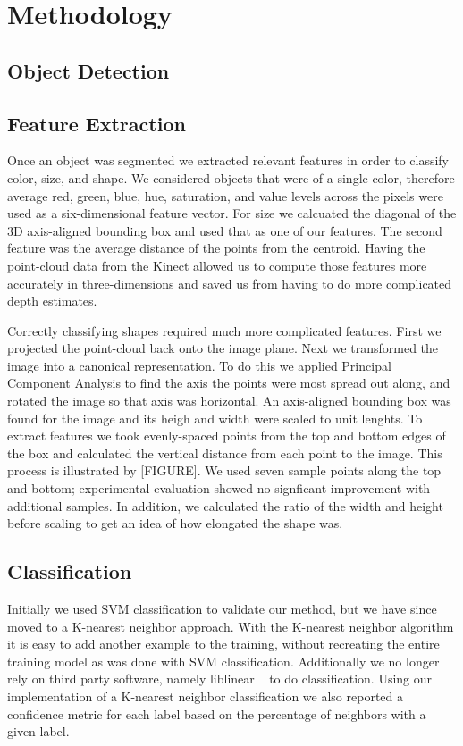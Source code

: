 \documentclass[11pt]{article}
\newcommand{\xxx}[1]{{\bf \color{red} #1}}
\begin{document}
\section{Methodology}

\subsection{Object Detection}

\subsection{Feature Extraction}

Once an object was segmented we extracted relevant features in order to classify
color, size, and shape. We considered objects that were of a single color, therefore
average red, green, blue, hue, saturation, and value levels across the pixels were
used as a six-dimensional feature vector. For size we calcuated the diagonal of the 3D
axis-aligned bounding box and used that as one of our features. The second feature was
the average distance of the points from the centroid. Having the point-cloud data from
the Kinect allowed us to compute those features more accurately in three-dimensions
and saved us from having to do more complicated depth estimates.

Correctly classifying shapes required much more complicated features. First we
projected the point-cloud back onto the image plane. Next we transformed the image
into a canonical representation. To do this we applied Principal Component Analysis to
find the axis the points were most spread out along, and rotated the image so that
axis was horizontal. An axis-aligned bounding box was found for the image and its
heigh and width were scaled to unit lenghts. To extract features we took evenly-spaced
points from the top and bottom edges of the box and calculated the vertical distance
from each point to the image. This process is illustrated by [FIGURE]. We used seven
sample points along the top and bottom; experimental evaluation showed no signficant
improvement with additional samples. In addition, we calculated the ratio of the width
and height before scaling to get an idea of how elongated the shape was.

\subsection{Classification}
Initially we used SVM classification to validate our method, but we have since
moved to a K-nearest neighbor approach.  With the K-nearest neighbor algorithm
it is easy to add another example to the training, without recreating the
entire training model as was done with SVM classification.  Additionally we no
longer rely on third party software, namely liblinear ~\cite{LIBLINEAR} to do
classification.  Using our implementation of a K-nearest neighbor
classification we also reported a confidence metric for each label based on the
percentage of neighbors with a given label.
\end{document}
